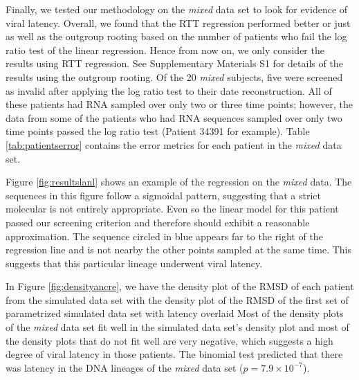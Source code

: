 \documentclass[12pt]{article}
\begin{document}

Finally, we tested our methodology on the {\em mixed} data set to look for evidence of viral latency.
Overall, we found that the RTT regression performed better or just as well as the outgroup rooting based on the number of patients who fail the log ratio test of the linear regression.
Hence from now on, we only consider the results using RTT regression.
See Supplementary Materials S1 for details of the results using the outgroup rooting.
Of the 20 \emph{mixed} subjects, five were screened as invalid after applying the log ratio test to their date reconstruction.
All of these patients had RNA sampled over only two or three time points; however, the data from some of the patients who had RNA sequences sampled over only two time points passed the log ratio test (Patient 34391 for example).
Table \ref{tab:patientserror} contains the error metrics for each patient in the \emph{mixed} data set.

Figure \ref{fig:resultslanl} shows an example of the regression on the \emph{mixed} data.
The sequences in this figure follow a sigmoidal pattern, suggesting that a strict molecular is not entirely appropriate.
Even so the linear model for this patient passed our screening criterion and therefore should exhibit a reasonable approximation.
The sequence circled in blue appears far to the right of the regression line and is not nearby the other points sampled at the same time.
This suggests that this particular lineage underwent viral latency.

In Figure \ref{fig:densityancre}, we have the density plot of the RMSD of each patient from the simulated data set with the density plot of the RMSD of the first set of parametrized simulated data set with latency overlaid
Most of the density plots of the \emph{mixed} data set fit well in the simulated data set's density plot and most of the density plots that do not fit well are very negative, which suggests a high degree of viral latency in those patients.
The binomial test predicted that there was latency in the DNA lineages of the \emph{mixed} data set ($p=7.9 \times 10^{-7}$).
\end{document}
